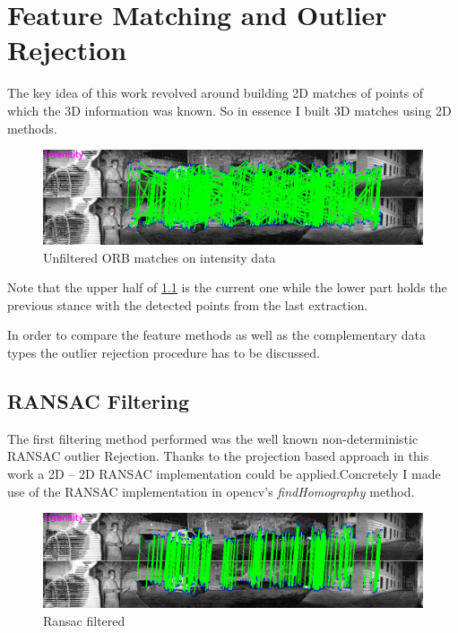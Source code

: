\chapter{Feature Matching and Outlier Rejection}\label{ch:matching}

The key idea of this work revolved around building 2D matches of points of which the 3D information was known. So in essence I built 3D matches using 2D methods.
\begin{figure}[ht]
    \centering
    \includegraphics[scale = 0.34]{images/matching_+_outlier_rejection/orb_matches_unfiltered.png}
    \caption{Unfiltered ORB matches on intensity data}
    \label{fig:match_preview}
\end{figure}


Note that the upper half of \cref{fig:match_preview} is the current one while the lower part holds the previous stance with the detected points from the last extraction.

In order to compare the feature methods as well as the complementary data types the outlier rejection procedure has to be discussed.

\section{RANSAC Filtering}{
    The first filtering method performed was the well known non-deterministic RANSAC outlier Rejection. 
    Thanks to the projection based approach in this work a 2D – 2D RANSAC implementation could be applied.Concretely I made use of the RANSAC implementation in opencv's \textit{findHomography} method.

    \begin{figure}[ht]
        \centering
        \includegraphics[scale=0.34]{images/matching_+_outlier_rejection/orb_matches_ransac_filtered.png}
        \caption{Ransac filtered}
        \label{fig:ransac_preview}
    \end{figure}
}


